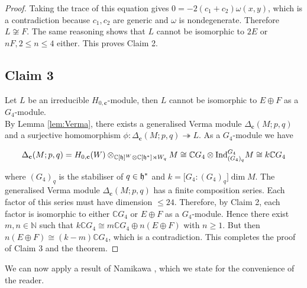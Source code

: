 \documentclass[a4apper,10pt]{amsart}
\theoremstyle{definition}
\numberwithin{thm}{section}
\newcommand{\N}{\mathbb{N}}
\newcommand{\C}{\mathbb{C}}
\begin{document}
\begin{proof}
\noindent Taking the trace of this equation gives $0 = -2(c_1 + c_2)\omega(x,y)$, which is a contradiction because $c_1,c_2$ are generic and $\omega$ is nondegenerate. Therefore $L \not\cong F$. The same reasoning shows that $L$ cannot be isomorphic to $2E$ or $nF, 2 \le n \le 4$ either. This proves Claim 2.\\

\subsection*{Claim 3} Let $L$ be an irreducible $H_{0,\mathbf{c}}$-module, then $L$ cannot be isomorphic to $E \oplus F$ as a $G_4$-module.\\

\noindent By Lemma \ref{lem:Verma}, there exists a generalised Verma module $\Delta_{\mathbf{c}}(M;p,q)$ and a surjective homomorphism $\phi : \Delta_{\mathbf{c}}(M;p,q) \twoheadrightarrow L$. As a $G_4$-module we have 

\begin{displaymath}
\Delta_{\mathbf{c}}(M;p,q)  = H_{0,\mathbf{c}}(W) \otimes_{\C[\frak{h}]^W \otimes
  \C[\frak{h}^*] \rtimes W_q} M \cong \C G_4 \otimes \textrm{Ind}_{(G_4)_q}^{G_4} M \cong k \C G_4
  \end{displaymath}
  
\noindent where $(G_4)_q$ is the stabiliser of $q \in \frak{h}^*$ and $k = \lbrack G_4 : (G_4)_q \rbrack \dim M$. The generalised Verma module $\Delta_{\mathbf{c}}(M;p,q)$ has a finite composition series. Each factor of this series must have dimension $\le 24$. Therefore, by Claim 2, each factor is isomorphic to either $\C G_4$ or $E \oplus F$ as a $G_4$-module. Hence there exist $m,n \in \N$ such that $k \C G_4 \cong m \C G_4 \oplus n (E \oplus F)$ with $n \ge 1$. But then $n (E \oplus F) \cong (k - m) \C G_4$, which is a contradiction. This completes the proof of Claim 3 and the theorem.
\end{proof}


We can now apply a result of Namikawa \cite[Corollary 2.10]{9}, which we state for the convenience of the reader.
\end{document}
